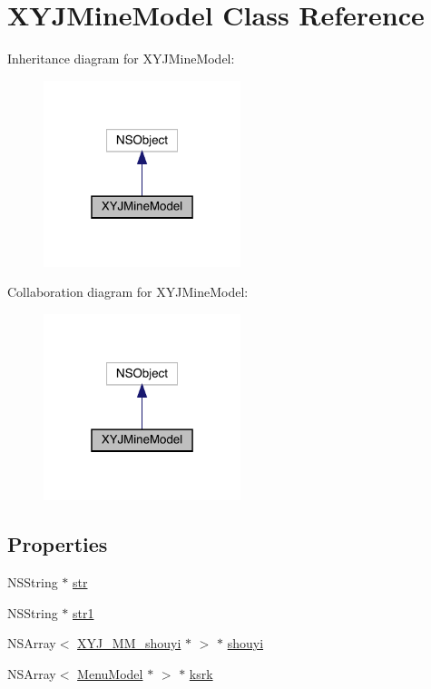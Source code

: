 \hypertarget{interface_x_y_j_mine_model}{}\section{X\+Y\+J\+Mine\+Model Class Reference}
\label{interface_x_y_j_mine_model}


Inheritance diagram for X\+Y\+J\+Mine\+Model\+:\nopagebreak
\begin{figure}[H]
\begin{center}
\leavevmode
\includegraphics[width=163pt]{interface_x_y_j_mine_model__inherit__graph}
\end{center}
\end{figure}


Collaboration diagram for X\+Y\+J\+Mine\+Model\+:\nopagebreak
\begin{figure}[H]
\begin{center}
\leavevmode
\includegraphics[width=163pt]{interface_x_y_j_mine_model__coll__graph}
\end{center}
\end{figure}
\subsection*{Properties}
\begin{DoxyCompactItemize}
\item 
N\+S\+String $\ast$ \mbox{\hyperlink{interface_x_y_j_mine_model_a415d8af05cb6ebece0a968849bf5adbd}{str}}
\item 
N\+S\+String $\ast$ \mbox{\hyperlink{interface_x_y_j_mine_model_a745f8c56e473c4d6a062dab5e5b22ad8}{str1}}
\item 
N\+S\+Array$<$ \mbox{\hyperlink{interface_x_y_j___m_m__shouyi}{X\+Y\+J\+\_\+\+M\+M\+\_\+shouyi}} $\ast$ $>$ $\ast$ \mbox{\hyperlink{interface_x_y_j_mine_model_aa4f889cfb90be8cca501affe992f8718}{shouyi}}
\item 
N\+S\+Array$<$ \mbox{\hyperlink{interface_menu_model}{Menu\+Model}} $\ast$ $>$ $\ast$ \mbox{\hyperlink{interface_x_y_j_mine_model_ab214ae4fec320fcd340788e4cbc7bad4}{ksrk}}
\end{DoxyCompactItemize}


